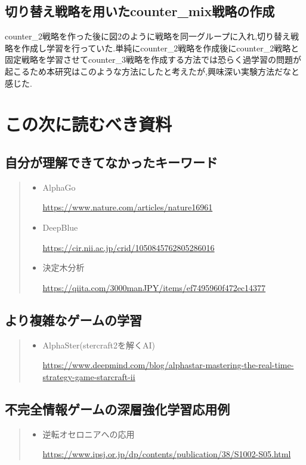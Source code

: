 \documentclass{jarticle}     %
\begin{document}
\subsection*{切り替え戦略を用いたcounter\_mix戦略の作成}
counter\_2戦略を作った後に図2のように戦略を同一グループに入れ,切り替え戦略を作成し学習を行っていた.単純にcounter\_2戦略を作成後にcounter\_2戦略と固定戦略を学習させてcounter\_3戦略を作成する方法では恐らく過学習の問題が起こるため本研究はこのような方法にしたと考えたが,興味深い実験方法だなと感じた.

\section*{この次に読むべき資料}



\subsection*{自分が理解できてなかったキーワード}

\begin{quote}
  \begin{itemize}
   \item AlphaGo \par
   \url{https://www.nature.com/articles/nature16961}
   \item DeepBlue\par
   \url{https://cir.nii.ac.jp/crid/1050845762805286016}
   \item 決定木分析\par
   \url{https://qiita.com/3000manJPY/items/ef7495960f472ec14377}
  \end{itemize}
 \end{quote}

\subsection*{より複雑なゲームの学習}

\begin{quote}
  \begin{itemize}
   \item AlphaSter(stercraft2を解くAI) \par
   \url{https://www.deepmind.com/blog/alphastar-mastering-the-real-time-strategy-game-starcraft-ii}
  \end{itemize}
 \end{quote}

\subsection*{不完全情報ゲームの深層強化学習応用例}

\begin{quote}
  \begin{itemize}
   \item 逆転オセロニアへの応用\par
   \url{https://www.ipsj.or.jp/dp/contents/publication/38/S1002-S05.html}
  \end{itemize}
 \end{quote}







\end{document}
